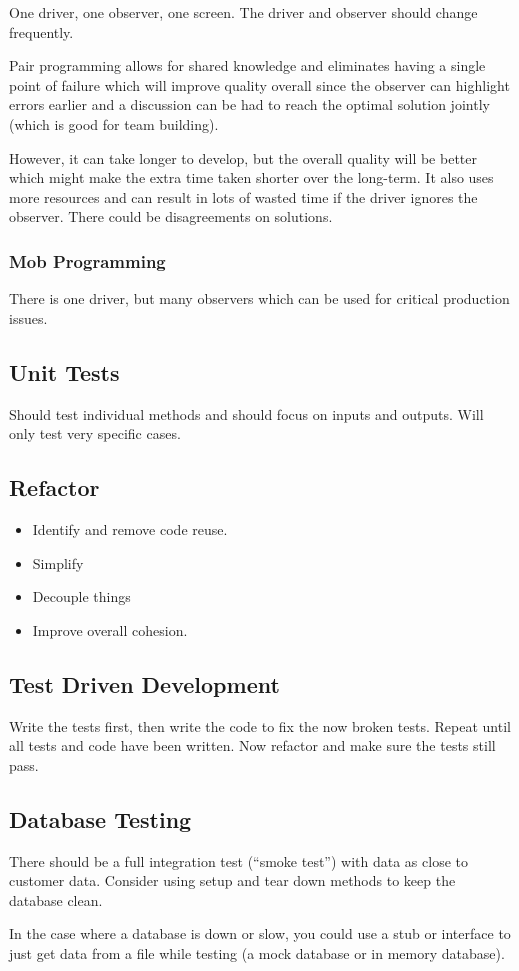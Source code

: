 One driver, one observer, one screen.
The driver and observer should change frequently.

Pair programming allows for shared knowledge and eliminates having a single point of failure which will improve quality overall since the observer can highlight errors earlier and a discussion can be had to reach the optimal solution jointly (which is good for team building).

However, it can take longer to develop, but the overall quality will be better which might make the extra time taken shorter over the long-term.
It also uses more resources and can result in lots of wasted time if the driver ignores the observer.
There could be disagreements on solutions.

\subsubsection{Mob Programming}\label{ssub:mob_programming}

There is one driver, but many observers which can be used for critical production issues.

\subsection{Unit Tests}\label{sub:unit_tests}

Should test individual methods and should focus on inputs and outputs.
Will only test very specific cases.

\subsection{Refactor}\label{sub:refactor}

\begin{itemize}
    \item Identify and remove code reuse.
    \item Simplify
    \item Decouple things
    \item Improve overall cohesion.
\end{itemize}

\subsection{Test Driven Development}\label{sub:test_driven_development}

Write the tests first, then write the code to fix the now broken tests.
Repeat until all tests and code have been written.
Now refactor and make sure the tests still pass.

\subsection{Database Testing}\label{sub:database_testing}

There should be a full integration test (``smoke test'') with data as close to customer data.
Consider using setup and tear down methods to keep the database clean.

In the case where a database is down or slow, you could use a stub or interface to just get data from a file while testing (a mock database or in memory database).
